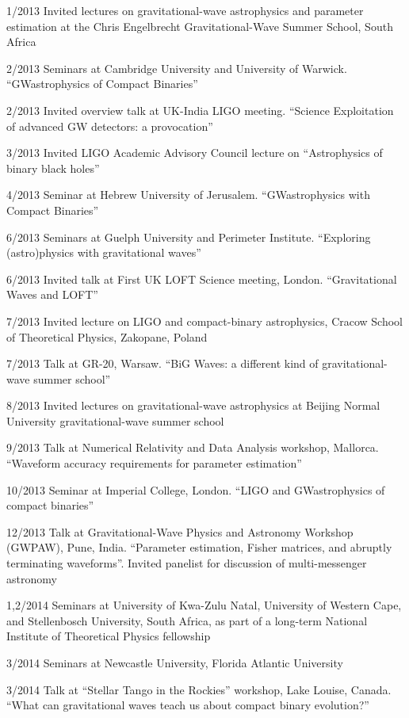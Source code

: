 \documentclass[margin,line]{res}
\begin{document}
\begin{resume}
1/2013 	Invited lectures on gravitational-wave astrophysics and parameter estimation at the Chris Engelbrecht Gravitational-Wave Summer School, South Africa

2/2013	Seminars at Cambridge University and University of Warwick.  ``GWastrophysics of Compact Binaries'' 

2/2013	Invited overview talk at UK-India LIGO meeting.  ``Science Exploitation of advanced GW detectors: a provocation''

3/2013	Invited LIGO Academic Advisory Council lecture on ``Astrophysics of binary black holes''

4/2013 	Seminar at Hebrew University of Jerusalem.  ``GWastrophysics with Compact Binaries'' 

6/2013	Seminars at Guelph University and Perimeter Institute.  ``Exploring (astro)physics with gravitational waves''

6/2013	Invited talk at First UK LOFT Science meeting, London.  ``Gravitational Waves 
and LOFT''

7/2013	Invited lecture on LIGO and compact-binary astrophysics, Cracow School of Theoretical Physics, Zakopane, Poland

7/2013	Talk at GR-20, Warsaw.  ``BiG Waves: a different kind of gravitational-wave summer school''
 
8/2013	Invited lectures on gravitational-wave astrophysics at Beijing Normal University gravitational-wave summer school
 
9/2013 	Talk at Numerical Relativity and Data Analysis workshop, Mallorca. ``Waveform accuracy requirements for parameter estimation''

10/2013 	Seminar at Imperial College, London. ``LIGO and GWastrophysics of compact binaries''

12/2013   Talk at Gravitational-Wave Physics and Astronomy Workshop (GWPAW), Pune, India.  ``Parameter estimation, Fisher matrices, and abruptly terminating waveforms''.  Invited panelist for discussion of multi-messenger astronomy

1,2/2014	Seminars at University of Kwa-Zulu Natal, University of Western Cape, and Stellenbosch University, South Africa, as part of a long-term National Institute of Theoretical Physics fellowship

3/2014	Seminars at Newcastle University, Florida Atlantic University

3/2014	Talk at ``Stellar Tango in the Rockies'' workshop, Lake Louise, Canada.  ``What can gravitational waves teach us about compact binary evolution?''


\end{resume}
\end{document}
